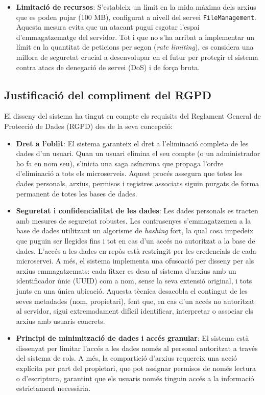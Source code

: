 \begin{itemize}
    \item \textbf{Limitació de recursos}: S'estableix un límit en la mida màxima dels arxius que es poden pujar (100 MB), configurat a nivell del servei \texttt{FileManagement}. Aquesta mesura evita que un atacant pugui esgotar l'espai d'emmagatzematge del servidor. Tot i que no s'ha arribat a implementar un límit en la quantitat de peticions per segon (\textit{rate limiting}), es considera una millora de seguretat crucial a desenvolupar en el futur per protegir el sistema contra atacs de denegació de servei (DoS) i de força bruta.
\end{itemize}

\subsection{Justificació del compliment del RGPD}
El disseny del sistema ha tingut en compte els requisits del Reglament General de Protecció de Dades (RGPD) des de la seva concepció:
\begin{itemize}
  \item \textbf{Dret a l'oblit}: El sistema garanteix el dret a l'eliminació completa de les dades d'un usuari. Quan un usuari elimina el seu compte (o un administrador ho fa en nom seu), s'inicia una saga asíncrona que propaga l'ordre d'eliminació a tots els microserveis. Aquest procés assegura que totes les dades personals, arxius, permisos i registres associats siguin purgats de forma permanent de totes les bases de dades.
  
  \item \textbf{Seguretat i confidencialitat de les dades}: Les dades personals es tracten amb mesures de seguretat robustes. Les contrasenyes s'emmagatzemen a la base de dades utilitzant un algorisme de \textit{hashing} fort, la qual cosa impedeix que puguin ser llegides fins i tot en cas d'un accés no autoritzat a la base de dades. L'accés a les dades en repòs està restringit per les credencials de cada microservei. A més, el sistema implementa una ofuscació per disseny per als arxius emmagatzemats: cada fitxer es desa al sistema d'arxius amb un identificador únic (UUID) com a nom, sense la seva extensió original, i tots junts en una única ubicació. Aquesta tècnica desacobla el contingut de les seves metadades (nom, propietari), fent que, en cas d'un accés no autoritzat al servidor, sigui extremadament difícil identificar, interpretar o associar els arxius amb usuaris concrets.
  
  \item \textbf{Principi de minimització de dades i accés granular}: El sistema està dissenyat per limitar l'accés a les dades només al personal autoritzat a través del sistema de rols. A més, la compartició d'arxius requereix una acció explícita per part del propietari, que pot assignar permisos de només lectura o d'escriptura, garantint que els usuaris només tinguin accés a la informació estrictament necessària.
\end{itemize}

